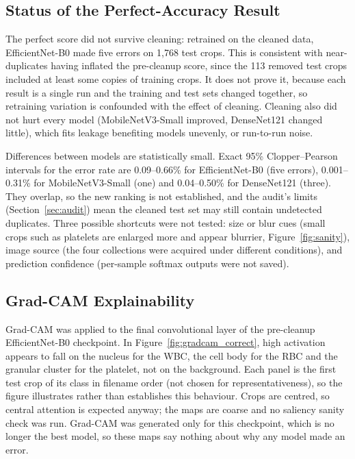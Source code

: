 \documentclass[11pt,a4paper]{article}
\begin{document}
\subsection{Status of the Perfect-Accuracy Result}\label{sec:validation}

The perfect score did not survive cleaning: retrained on the cleaned data, EfficientNet-B0 made five errors on 1,768 test crops. This is consistent with near-duplicates having inflated the pre-cleanup score, since the 113 removed test crops included at least some copies of training crops. It does not prove it, because each result is a single run and the training and test sets changed together, so retraining variation is confounded with the effect of cleaning. Cleaning also did not hurt every model (MobileNetV3-Small improved, DenseNet121 changed little), which fits leakage benefiting models unevenly, or run-to-run noise.

Differences between models are statistically small. Exact 95\% Clopper--Pearson intervals for the error rate are 0.09--0.66\% for EfficientNet-B0 (five errors), 0.001--0.31\% for MobileNetV3-Small (one) and 0.04--0.50\% for DenseNet121 (three). They overlap, so the new ranking is not established, and the audit's limits (Section~\ref{sec:audit}) mean the cleaned test set may still contain undetected duplicates. Three possible shortcuts were not tested: size or blur cues (small crops such as platelets are enlarged more and appear blurrier, Figure~\ref{fig:sanity}), image source (the four collections were acquired under different conditions), and prediction confidence (per-sample softmax outputs were not saved).

\subsection{Grad-CAM Explainability}

Grad-CAM \citep{selvaraju2017gradcam} was applied to the final convolutional layer of the pre-cleanup EfficientNet-B0 checkpoint. In Figure~\ref{fig:gradcam_correct}, high activation appears to fall on the nucleus for the WBC, the cell body for the RBC and the granular cluster for the platelet, not on the background. Each panel is the first test crop of its class in filename order (not chosen for representativeness), so the figure illustrates rather than establishes this behaviour. Crops are centred, so central attention is expected anyway; the maps are coarse and no saliency sanity check \citep{adebayo2018sanity} was run. Grad-CAM was generated only for this checkpoint, which is no longer the best model, so these maps say nothing about why any model made an error.
\end{document}
